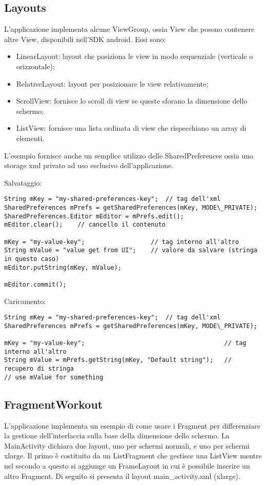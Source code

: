 \subsection{Layouts}
L'applicazione implementa alcune ViewGroup, ossia View che posono contenere altre View, disponibili nell'SDK android. Essi sono:
\begin{itemize}
	\item LinearLayout: layout che posiziona le view in modo sequenziale (verticale o orizzontale);
	\item RelativeLayout: layout per posizionare le view relativamente;
	\item ScrollView: fornisce lo scroll di view se queste sforano la dimensione dello schermo;
	\item ListView: fornisce una lista ordinata di view che rispecchiano un array di elementi.
\end{itemize}

L'esempio fornisce anche un semplice utilizzo delle SharedPreferences ossia uno storage xml privato ad uso esclusivo dell'applicazione.

Salvataggio:
\begin{lstlisting}
String mKey = "my-shared-preferences-key";	// tag dell'xml
SharedPreferences mPrefs = getSharedPreferences(mKey, MODE\_PRIVATE);
SharedPreferences.Editor mEditor = mPrefs.edit();
mEditor.clear();	// cancello il contenuto

mKey = "my-value-key";					// tag interno all'altro
String mValue = "value get from UI";	// valore da salvare (stringa in questo caso)
mEditor.putString(mKey, mValue);		

mEditor.commit();
\end{lstlisting}

Caricamento:
\begin{lstlisting}
String mKey = "my-shared-preferences-key";	// tag dell'xml
SharedPreferences mPrefs = getSharedPreferences(mKey, MODE\_PRIVATE);

mKey = "my-value-key";										// tag interno all'altro
String mValue = mPrefs.getString(mKey, "Default string");	// recupero di stringa
// use mValue for something
\end{lstlisting}


\subsection{FragmentWorkout}
L'applicazione implementa un esempio di come usare i Fragment per differenziare la gestione dell'interfaccia sulla base della dimensione dello schermo.
La MainActivity dichiara due layout, uno per schermi normali, e uno per schermi xlarge. Il primo è costituito da un ListFragment che gestisce una ListView mentre nel secondo a questo si aggiunge un FrameLayout in cui è possibile inserire un altro Fragment. Di seguito si presenta il layout main\_activity.xml (xlarge).

